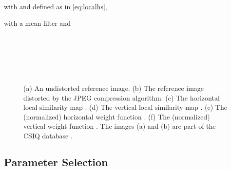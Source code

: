 \documentclass[11pt,a4paper]{article}
\begin{document}
with  and  defined as in \eqref{eq:localhs},

\setlength{\arraycolsep}{5pt}
with a  mean filter  and


\begin{figure}[!htb]
  \centering
  \begin{minipage}{0.28\textwidth}
	\\
  \end{minipage}\hfil  
  \begin{minipage}{0.28\textwidth}  
  \\
\end{minipage}\hfil  
\begin{minipage}{0.28\textwidth}
\\
\end{minipage}  
  \caption{(a) An undistorted reference image. (b) The reference image distorted by the JPEG compression algorithm. (c) The horizontal local similarity map . (d) The vertical local similarity map . (e) The (normalized) horizontal weight function . (f) The (normalized) vertical weight function . The images (a) and (b) are part of the CSIQ database \cite{LaCh2010}.}
  \label{fig:haarmaps}
\end{figure}

\subsection{Parameter Selection}
\end{document}
